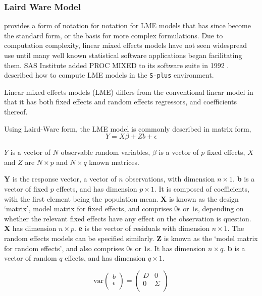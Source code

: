 \documentclass[12pt, a4paper]{report}
\theoremstyle{plain}
\theoremstyle{definition}
\theoremstyle{remark}
\begin{document}
	
	
	\subsubsection{Laird Ware Model} 
	\citet{LW82} provides a form of notation for notation for LME models that has since become the standard form, or the basis for more complex formulations. Due to computation complexity, linear mixed effects models have not seen widespread use until many well known statistical software applications began facilitating them. SAS Institute added PROC MIXED to its software suite in 1992 \citep{singer}. \citet{PB} described how to compute LME models in the \texttt{S-plus} environment.
	
	Linear mixed effects models (LME)
	differs from the conventional linear model in that it has both
	fixed effects and random effects regressors, and coefficients
	thereof. 
	
	
	
	Using Laird-Ware form, the LME model is commonly described in matrix form,
	\begin{equation}
	Y = X\beta + Zb + \epsilon
	\label{LW}
	\end{equation}
	
	
	$Y$ is a vector of $N$ observable random variables, $\beta$ is a vector of $p$ fixed effects, $X$ and $Z$ are $N \times p$ and $N \times q$ known matrices.
	
	\textbf{Y} is the response vector, a vector of $n$ observations, with dimension $n
	\times 1$. \textbf{b} is a vector of fixed $p$ effects, and has
	dimension $p \times 1$. It is composed of coefficients, with the
	first element being the population mean.  \textbf{X} is known as
	the design `matrix', model matrix for fixed effects, and comprises
	$0$s or $1$s, depending on whether the relevant fixed effects have
	any effect on the observation is question. \textbf{X} has
	dimension $n \times p$. \textbf{e} is the vector of residuals with
	dimension $n \times 1$. The random effects models can be specified similarly. \textbf{Z}
	is known as the `model matrix for random effects', and also
	comprises $0$s or $1$s. It has dimension $n \times q$. \textbf{b
	}is a vector of random $q$ effects, and has dimension $q \times
	1$.
	
	\[
	\mathrm{var}
	\left(
	\begin{array}{c}
	b \\
	\epsilon \\
	\end{array}
	\right)
	=
	\left(
	\begin{array}{cc}
	D & 0 \\
	0 & \Sigma \\
	\end{array}
	\right)
	\]
	
\end{document}
